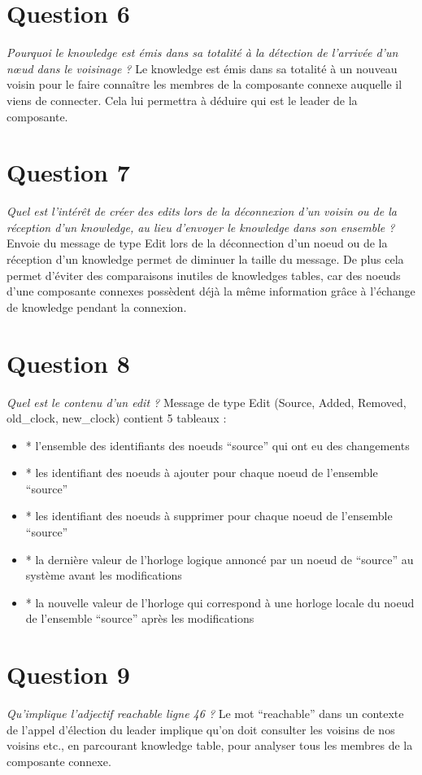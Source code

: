\documentclass[11pt,a4paper,sans]{report}
\begin{document}
	\section{Question 6}
	\textit{Pourquoi le knowledge est émis dans sa totalité à la détection de l’arrivée d’un nœud dans le voisinage ?}
	Le knowledge est émis dans sa totalité à un nouveau voisin pour le faire connaître les membres de la composante connexe auquelle il viens de connecter. Cela lui permettra à déduire qui est le leader de la composante.


	\section{Question 7}
	\textit{Quel est l’intérêt de créer des edits lors de la déconnexion d’un voisin ou de la réception d’un knowledge, au lieu d’envoyer le knowledge dans son ensemble ?}
	Envoie du message de type Edit lors de la déconnection d’un noeud ou de la réception d’un knowledge permet de diminuer la taille du message. De plus cela permet d’éviter des comparaisons inutiles de knowledges tables, car des noeuds d’une composante connexes possèdent déjà la même information grâce à l'échange de knowledge pendant la connexion.



	\section{Question 8}
	\textit{Quel est le contenu d’un edit ?}
	Message de type Edit (Source, Added, Removed, old\_clock, new\_clock) contient 5 tableaux : 
	\begin{itemize}
		\item * l’ensemble des identifiants des noeuds “source” qui ont eu des changements
		\item * les identifiant des noeuds à ajouter pour chaque noeud de l’ensemble  “source”
		\item * les identifiant des noeuds à supprimer pour chaque noeud de l’ensemble  “source”
		\item * la dernière valeur de l’horloge logique annoncé par un noeud de “source” au système avant les modifications
		\item * la nouvelle valeur de l’horloge qui correspond à une horloge locale du noeud de l’ensemble  “source” après les modifications
	\end{itemize}

	\section{Question 9}
	\textit{Qu’implique l’adjectif reachable ligne 46 ?}
	Le mot “reachable” dans un contexte de l’appel d'élection du leader implique qu’on doit consulter les voisins de nos voisins etc., en parcourant knowledge table, pour analyser tous les membres de la composante connexe.
\end{document}

